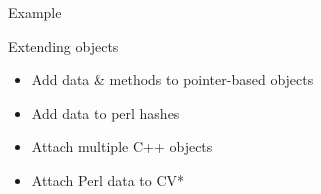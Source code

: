 \documentclass[mathserif,hyperref={urlcolor=cyan,colorlinks=true}]{beamer}
\begin{document}
\begin{frame}{Example}
\begin{figure}
\end{figure}
\begin{figure}
\end{figure}
\end{frame}

\begin{frame}{Extending objects}
\begin{itemize}
\item<1-> Add data \& methods to pointer-based objects
\item<2-> Add data to perl hashes
\item<3-> Attach multiple C++ objects
\item<4-> Attach Perl data to CV*
\end{itemize}
\end{frame}

\begin{frame}{}
\begin{figure}
\end{figure}
\end{frame}
\end{document}
